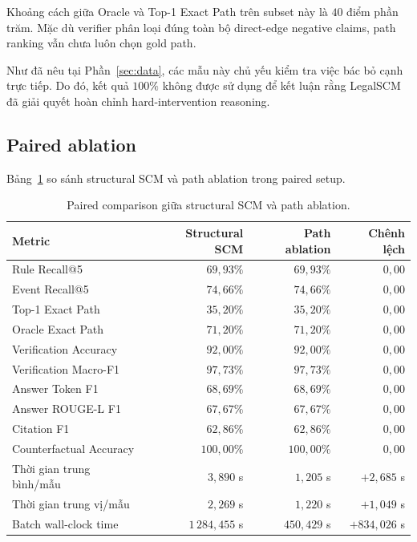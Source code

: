 Khoảng cách giữa Oracle và Top-1 Exact Path trên subset này là \(40\) điểm
phần trăm. Mặc dù verifier phân loại đúng toàn bộ direct-edge negative
claims, path ranking vẫn chưa luôn chọn gold path.

Như đã nêu tại Phần~\ref{sec:data}, các mẫu này chủ yếu kiểm tra việc bác bỏ
cạnh trực tiếp. Do đó, kết quả \(100\%\) không được sử dụng để kết luận rằng
LegalSCM đã giải quyết hoàn chỉnh hard-intervention reasoning.

\subsection{Paired ablation}

Bảng~\ref{tab:paired-ablation} so sánh structural SCM và path ablation trong
paired setup.

\begin{table}[t]
    \centering
    \caption{Paired comparison giữa structural SCM và path ablation.}
    \label{tab:paired-ablation}
    \begin{tabular}{lrrr}
        \hline
        \textbf{Metric} &
        \textbf{Structural SCM} &
        \textbf{Path ablation} &
        \textbf{Chênh lệch} \\
        \hline
        Rule Recall@5 &
        \(69{,}93\%\) & \(69{,}93\%\) & \(0{,}00\) \\
        Event Recall@5 &
        \(74{,}66\%\) & \(74{,}66\%\) & \(0{,}00\) \\
        Top-1 Exact Path &
        \(35{,}20\%\) & \(35{,}20\%\) & \(0{,}00\) \\
        Oracle Exact Path &
        \(71{,}20\%\) & \(71{,}20\%\) & \(0{,}00\) \\
        Verification Accuracy &
        \(92{,}00\%\) & \(92{,}00\%\) & \(0{,}00\) \\
        Verification Macro-F1 &
        \(97{,}73\%\) & \(97{,}73\%\) & \(0{,}00\) \\
        Answer Token F1 &
        \(68{,}69\%\) & \(68{,}69\%\) & \(0{,}00\) \\
        Answer ROUGE-L F1 &
        \(67{,}67\%\) & \(67{,}67\%\) & \(0{,}00\) \\
        Citation F1 &
        \(62{,}86\%\) & \(62{,}86\%\) & \(0{,}00\) \\
        Counterfactual Accuracy &
        \(100{,}00\%\) & \(100{,}00\%\) & \(0{,}00\) \\
        \hline
        Thời gian trung bình/mẫu &
        \(3{,}890\) s & \(1{,}205\) s & \(+2{,}685\) s \\
        Thời gian trung vị/mẫu &
        \(2{,}269\) s & \(1{,}220\) s & \(+1{,}049\) s \\
        Batch wall-clock time &
        \(1\,284{,}455\) s & \(450{,}429\) s & \(+834{,}026\) s \\
        \hline
    \end{tabular}
\end{table}

